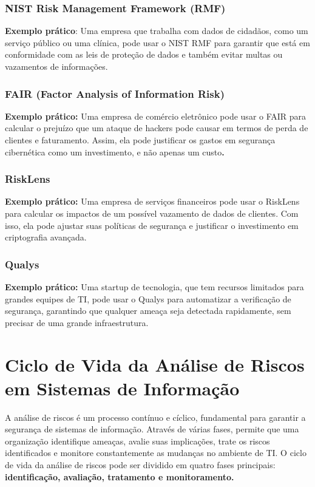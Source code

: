 \documentclass[12pt,oneside,a4paper,article]{abntex2}
\begin{document}
\subsubsection{\textbf{NIST Risk Management Framework (RMF})
}
\textbf{Exemplo prático}: Uma empresa que trabalha com dados de cidadãos, como um serviço público ou uma clínica, pode usar o NIST RMF para garantir que está em conformidade com as leis de proteção de dados e também evitar multas ou vazamentos de informações.

\subsubsection{\textbf{FAIR (Factor Analysis of Information Risk)
}}

\textbf{Exemplo prático:} Uma empresa de comércio eletrônico pode usar o FAIR para calcular o prejuízo que um ataque de hackers pode causar em termos de perda de clientes e faturamento. Assim, ela pode justificar os gastos em segurança cibernética como um investimento, e não apenas um custo\textbf{.}

\subsubsection{\textbf{RiskLens}}

{\textbf{Exemplo prático:} Uma empresa de serviços financeiros pode usar o RiskLens para calcular os impactos de um possível vazamento de dados de clientes. Com isso, ela pode ajustar suas políticas de segurança e justificar o investimento em criptografia avançada.}

\subsubsection{\textbf{Qualys}}

\textbf{Exemplo prático: }Uma startup de tecnologia, que tem recursos limitados para grandes equipes de TI, pode usar o Qualys para automatizar a verificação de segurança, garantindo que qualquer ameaça seja detectada rapidamente, sem precisar de uma grande
infraestrutura.



\section{\textbf{Ciclo de Vida da Análise de Riscos em Sistemas de Informação}}

{A análise de riscos é um processo contínuo e cíclico, fundamental para garantir a segurança de sistemas de informação. Através de várias fases, permite que uma organização identifique ameaças, avalie suas implicações, trate os riscos identificados e monitore constantemente as mudanças no ambiente de TI. O ciclo de vida da análise de riscos pode ser dividido em quatro fases principais: \textbf{identificação, avaliação, tratamento e monitoramento.}}
\end{document}
